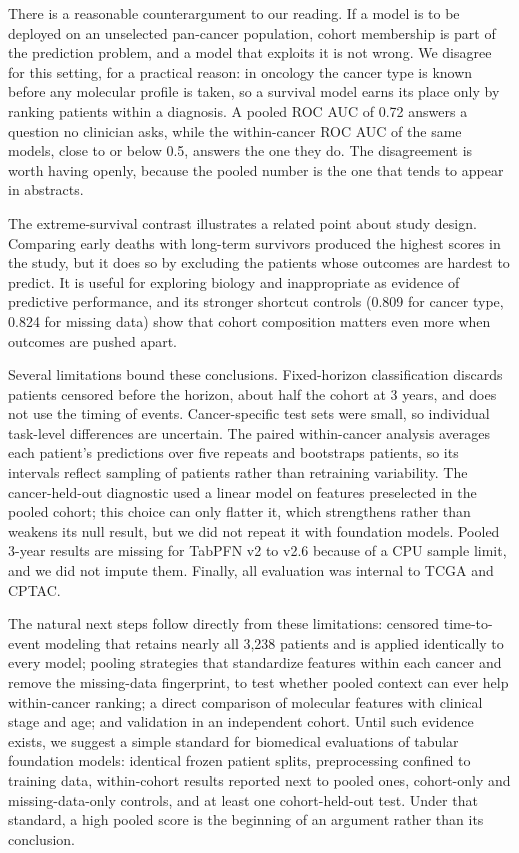 \documentclass[11pt, a4paper, onecolumn, confidential, copyright]{hawkfranklin}
\begin{document}
There is a reasonable counterargument to our reading. If a model is to be deployed on an unselected pan-cancer population, cohort membership is part of the prediction problem, and a model that exploits it is not wrong. We disagree for this setting, for a practical reason: in oncology the cancer type is known before any molecular profile is taken, so a survival model earns its place only by ranking patients within a diagnosis. A pooled ROC AUC of 0.72 answers a question no clinician asks, while the within-cancer ROC AUC of the same models, close to or below 0.5, answers the one they do. The disagreement is worth having openly, because the pooled number is the one that tends to appear in abstracts.

The extreme-survival contrast illustrates a related point about study design. Comparing early deaths with long-term survivors produced the highest scores in the study, but it does so by excluding the patients whose outcomes are hardest to predict. It is useful for exploring biology and inappropriate as evidence of predictive performance, and its stronger shortcut controls (0.809 for cancer type, 0.824 for missing data) show that cohort composition matters even more when outcomes are pushed apart.

Several limitations bound these conclusions. Fixed-horizon classification discards patients censored before the horizon, about half the cohort at 3 years, and does not use the timing of events. Cancer-specific test sets were small, so individual task-level differences are uncertain. The paired within-cancer analysis averages each patient's predictions over five repeats and bootstraps patients, so its intervals reflect sampling of patients rather than retraining variability. The cancer-held-out diagnostic used a linear model on features preselected in the pooled cohort; this choice can only flatter it, which strengthens rather than weakens its null result, but we did not repeat it with foundation models. Pooled 3-year results are missing for TabPFN v2 to v2.6 because of a CPU sample limit, and we did not impute them. Finally, all evaluation was internal to TCGA and CPTAC.

The natural next steps follow directly from these limitations: censored time-to-event modeling that retains nearly all 3,238 patients and is applied identically to every model; pooling strategies that standardize features within each cancer and remove the missing-data fingerprint, to test whether pooled context can ever help within-cancer ranking; a direct comparison of molecular features with clinical stage and age; and validation in an independent cohort. Until such evidence exists, we suggest a simple standard for biomedical evaluations of tabular foundation models: identical frozen patient splits, preprocessing confined to training data, within-cohort results reported next to pooled ones, cohort-only and missing-data-only controls, and at least one cohort-held-out test. Under that standard, a high pooled score is the beginning of an argument rather than its conclusion.
\end{document}
